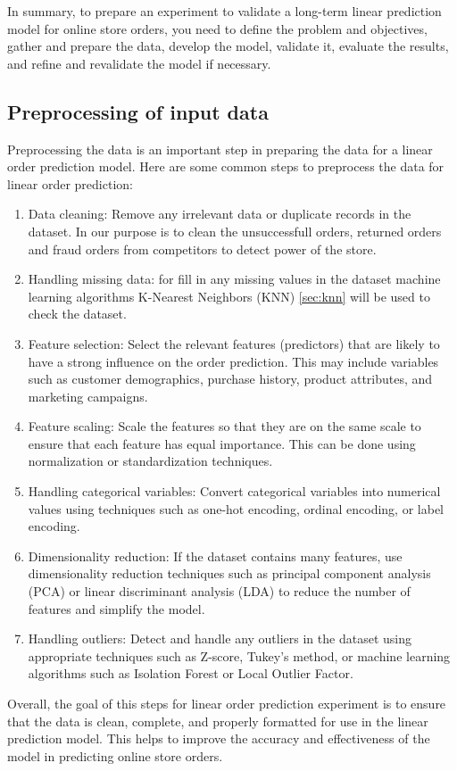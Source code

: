 In summary, to prepare an experiment to validate a long-term linear prediction model for online store orders, you need to
define the problem and objectives, gather and prepare the data, develop the model, validate it, evaluate the results, and refine and revalidate
the model if necessary.
    \subsection{Preprocessing of input data} \label{subsec:preprocessing}
    Preprocessing the data is an important step in preparing the data for a linear order prediction model. Here are some common
    steps to preprocess the data for linear order prediction:

    \begin{enumerate}
        \item Data cleaning: Remove any irrelevant data or duplicate records in the dataset. In our purpose is to clean the unsuccessfull orders,
        returned orders and fraud orders from competitors to detect power of the store.
        \item Handling missing data: for fill in any missing values in the dataset machine learning algorithms K-Nearest Neighbors (KNN) \ref{sec:knn} will be used
        to check the dataset.
        \item Feature selection: Select the relevant features (predictors) that are likely to have a strong influence on the order
        prediction. This may include variables such as customer demographics, purchase history, product attributes, and marketing campaigns.
        \item Feature scaling: Scale the features so that they are on the same scale to ensure that each feature has equal importance.
        This can be done using normalization or standardization techniques.
        \item Handling categorical variables: Convert categorical variables into numerical values using techniques
        such as one-hot encoding, ordinal encoding, or label encoding.
        \item Dimensionality reduction: If the dataset contains many features, use dimensionality reduction
        techniques such as principal component analysis (PCA) or linear discriminant analysis (LDA) to reduce the number of features and simplify the model.
        \item Handling outliers: Detect and handle any outliers in the dataset using appropriate techniques
        such as Z-score, Tukey’s method, or machine learning algorithms such as Isolation Forest or Local Outlier Factor.
    \end{enumerate}
    Overall, the goal of this steps for linear order prediction experiment is to ensure that the data is clean, complete, and properly
    formatted for use in the linear prediction model. This helps to improve the accuracy and effectiveness of the model in predicting online store orders.
